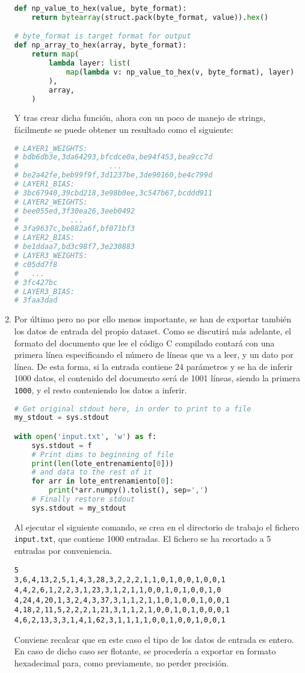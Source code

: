 \begin{enumerate}
\begin{lstlisting}[language=Python]
def np_value_to_hex(value, byte_format):
    return bytearray(struct.pack(byte_format, value)).hex()

# byte_format is target format for output
def np_array_to_hex(array, byte_format):
    return map(
        lambda layer: list(
            map(lambda v: np_value_to_hex(v, byte_format), layer)
        ),
        array,
    )
\end{lstlisting}
    Y tras crear dicha función, ahora con un poco de manejo de strings, fácilmente se puede obtener un resultado como el siguiente:\medskip
\begin{lstlisting}[language=Python]
# LAYER1_WEIGHTS:
# bdb6db3e,3da64293,bfcdce0a,be94f453,bea9cc7d
#                     ...
# be2a42fe,beb99f9f,3d1237be,3de90160,be4c799d
# LAYER1_BIAS:
# 3bc67940,39cbd218,3e98b0ee,3c547b67,bcddd911
# LAYER2_WEIGHTS:
# bee055ed,3f30ea26,3eeb0492
#            ...
# 3fa9637c,be882a6f,bf071bf3
# LAYER2_BIAS:
# be1ddaa7,bd3c98f7,3e230883
# LAYER3_WEIGHTS:
# c05dd7f8
#   ...
# 3fc427bc
# LAYER3_BIAS:
# 3faa3dad
\end{lstlisting}

    \item Por último pero no por ello menos importante, se han de exportar también los datos de entrada del propio dataset. Como se discutirá más adelante, el formato del documento que lee el código C compilado contará con una primera línea especificando el número de líneas que va a leer, y un dato por línea. De esta forma, si la entrada contiene 24 parámetros y se ha de inferir 1000 datos, el contenido del documento será de 1001 líneas, siendo la primera \texttt{1000}, y el resto conteniendo los datos a inferir.\medskip
\begin{lstlisting}[language=Python]
# Get original stdout here, in order to print to a file
my_stdout = sys.stdout

with open('input.txt', 'w') as f:
    sys.stdout = f
    # Print dims to beginning of file
    print(len(lote_entrenamiento[0]))
    # and data to the rest of it
    for arr in lote_entrenamiento[0]:
        print(*arr.numpy().tolist(), sep=',')
    # Finally restore stdout
    sys.stdout = my_stdout
\end{lstlisting}
    Al ejecutar el siguiente comando, se crea en el directorio de trabajo el fichero \texttt{input.txt}, que contiene 1000 entradas. El fichero se ha recortado a 5 entradas por conveniencia.\medskip
\begin{lstlisting}
5
3,6,4,13,2,5,1,4,3,28,3,2,2,2,1,1,0,1,0,0,1,0,0,1
4,4,2,6,1,2,2,3,1,23,3,1,2,1,1,0,0,1,0,1,0,0,1,0
4,24,4,20,1,3,2,4,3,37,3,1,1,2,1,1,0,1,0,0,1,0,0,1
4,18,2,11,5,2,2,2,1,21,3,1,1,2,1,0,0,1,0,1,0,0,0,1
4,6,2,13,3,3,1,4,1,62,3,1,1,1,1,0,0,1,0,0,1,0,0,1
\end{lstlisting}

    Conviene recalcar que en este caso el tipo de los datos de entrada es entero. En caso de dicho caso ser flotante, se procedería a exportar en formato hexadecimal para, como previamente, no perder precisión.
\end{enumerate}

